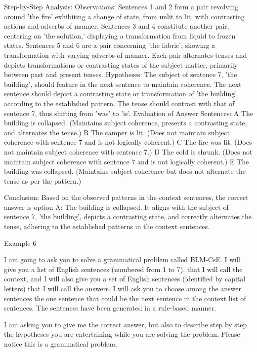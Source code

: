 Step-by-Step Analysis:
Observations:
Sentences 1 and 2 form a pair revolving around 'the fire' exhibiting a change of state, from unlit to lit, with contrasting actions and adverbs of manner.
Sentences 3 and 4 constitute another pair, centering on 'the solution,' displaying a transformation from liquid to frozen states.
Sentences 5 and 6 are a pair concerning 'the fabric', showing a transformation with varying adverbs of manner.
Each pair alternates tenses and depicts transformations or contrasting states of the subject matter, primarily between past and present tenses.
Hypotheses:
The subject of sentence 7, 'the building', should feature in the next sentence to maintain coherence.
The next sentence should depict a contrasting state or transformation of 'the building', according to the established pattern.
The tense should contrast with that of sentence 7, thus shifting from 'was' to 'is'.
Evaluation of Answer Sentences:
A The building is collapsed. (Maintains subject coherence, presents a contrasting state, and alternates the tense.)
B The camper is lit. (Does not maintain subject coherence with sentence 7 and is not logically coherent.)
C The fire was lit. (Does not maintain subject coherence with sentence 7.)
D The cold is shrunk. (Does not maintain subject coherence with sentence 7 and is not logically coherent.)
E The building was collapsed. (Maintains subject coherence but does not alternate the tense as per the pattern.)

Conclusion:
Based on the observed patterns in the context sentences, the correct answer is option A: The building is collapsed. It aligns with the subject of sentence 7, 'the building', depicts a contrasting state, and correctly alternates the tense, adhering to the established patterns in the context sentences.

Example 6

I am going to ask you to solve a grammatical problem called BLM-CsE.  I will give you a list of English sentences (numbered from 1 to 7), that I will call the context, and I will also give you a set of English sentences (identified by capital letters) that I will call  the answers. I will ask you to choose among the answer sentences the one sentence that could be the next sentence in the context list of sentences. The sentences have been generated in a rule-based manner. 

I am asking you to give me the correct answer, but also to describe step by step  the hypotheses you are entertaining while you are solving the problem. Please notice this is a grammatical problem.



